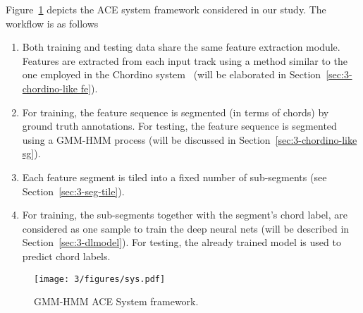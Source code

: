 Figure~\ref{fig:3-sysover} depicts the ACE system framework considered in our study. The workflow is as follows%
\begin{enumerate}
	
	\item Both training and testing data share the same feature extraction module. Features are extracted from each input track using a method similar to the one employed in the Chordino system~\cite{mauch2010automatic} (will be elaborated in Section~\ref{sec:3-chordino-like fe}).
	\item For training, the feature sequence is segmented (in terms of chords) by ground truth annotations. For testing, the feature sequence is segmented using a GMM-HMM process (will be discussed in Section~\ref{sec:3-chordino-like sg}).
	\item Each feature segment is tiled into a fixed number of sub-segments (see Section~\ref{sec:3-seg-tile}).
	\item For training, the sub-segments together with the segment's chord label, are considered as one sample to train the deep neural nets (will be described in Section~\ref{sec:3-dlmodel}). For testing, the already trained model is used to predict chord labels.
	
\end{enumerate}


\begin{figure}
\centering
\texttt{[image: 3/figures/sys.pdf]}
\caption{GMM-HMM ACE System framework.}
\label{fig:3-sysover}
\end{figure}

